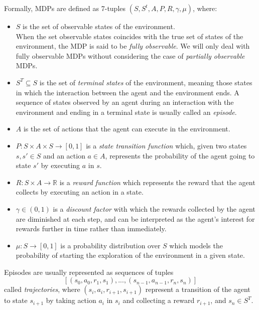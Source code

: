 Formally, MDPs are defined as 7-tuples $(S, S^{t}, A, P, R, \gamma, \mu)$, 
where:
\begin{itemize}
    \item $S$ is the set of observable states of the environment. \\
    When the set observable states coincides with the true set of states of the 
    environment, the MDP is said to be \textit{fully observable}. We will only 
    deal with fully observable MDPs without considering the case of 
    \textit{partially observable} MDPs.

    \item $S^{T} \subseteq S$ is the set of \textit{terminal states} of the 
    environment, meaning those states in which the interaction between the agent
    and the environment ends. A sequence of states observed by an agent during 
    an interaction with the environment and ending in a terminal state is 
    usually called an \textit{episode}.
 
    \item $A$ is the set of actions that the agent can execute in the 
    environment.
 
    \item $P: S \times A \times S \rightarrow [0,1]$ is a \textit{state 
    transition function} which, given two states $s, s' \in S$ and an action 
    $a \in A$, represents the probability of the agent going to state $s'$ by 
    executing $a$ in $s$.
 
    \item $R: S \times A \rightarrow \mathbb{R}$ is a \textit{reward function} 
    which represents the reward that the agent collects by executing an action 
    in a state. 
    
    \item $\gamma \in (0,1)$ is a \textit{discount factor} with which the 
    rewards collected by the agent are diminished at each step, and can be 
    interpreted as the agent's interest for rewards further in time rather than 
    immediately.
    
    \item $\mu: S \rightarrow [0, 1]$ is a probability distribution over $S$ 
    which models the probability of starting the exploration of the environment 
    in a given state.
\end{itemize}

Episodes are usually represented as sequences of tuples 
\[
    [(s_0, a_0, r_1, s_1), ..., (s_{n-1}, a_{n-1}, r_n, s_n)]
\]
called \textit{trajectories}, where $(s_i, a_i, r_{i+1}, s_{i+1})$ represent a
transition of the agent to state $s_{i+1}$ by taking action $a_i$ in $s_i$ and 
collecting a reward $r_{i+1}$, and $s_n \in S^T$.

